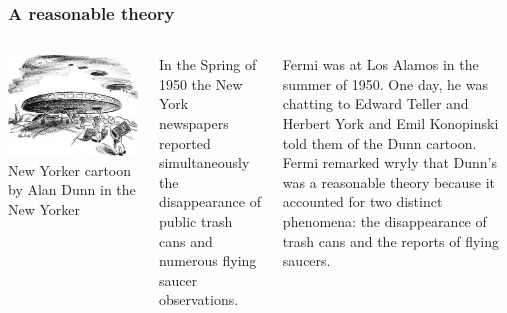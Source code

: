 \begin{frame}
\frametitle{A reasonable theory}

\begin{columns}
\includegraphics[scale=0.3]{aliens}
New Yorker cartoon by Alan Dunn in the New Yorker


In the Spring of 1950 the New York newspapers reported simultaneously the disappearance of public trash cans and numerous flying saucer observations. \vspace{0.5cm}

Fermi was at Los Alamos in the summer of 1950. One day, he was chatting to Edward Teller and Herbert York and Emil Konopinski told them of the Dunn cartoon. Fermi remarked wryly that Dunn's was a reasonable theory because it accounted for two distinct phenomena: the disappearance of trash cans and the reports of flying saucers. 
\end{columns}
\end{frame}

